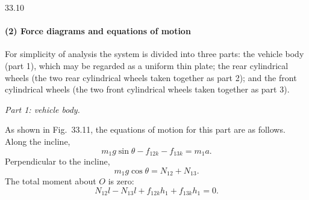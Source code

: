 \begin{figbox}{33.10}
\end{figbox}

\paragraph{(2) Force diagrams and equations of motion}

For simplicity of analysis the system is divided into three parts: the vehicle body (part 1), which may be regarded as a uniform thin plate; the rear cylindrical wheels (the two rear cylindrical wheels taken together as part 2); and the front cylindrical wheels (the two front cylindrical wheels taken together as part 3).

\emph{Part 1: vehicle body.}

As shown in Fig.~33.11, the equations of motion for this part are as follows. Along the incline,
\begin{equation}
m_1g\sin\theta-f_{12k}-f_{13k}=m_1a. \tag{1}
\end{equation}
Perpendicular to the incline,
\begin{equation}
m_1g\cos\theta=N_{12}+N_{13}. \tag{2}
\end{equation}
The total moment about $O$ is zero:
\begin{equation}
N_{12}l-N_{13}l+f_{12k}h_1+f_{13k}h_1=0. \tag{3}
\end{equation}

